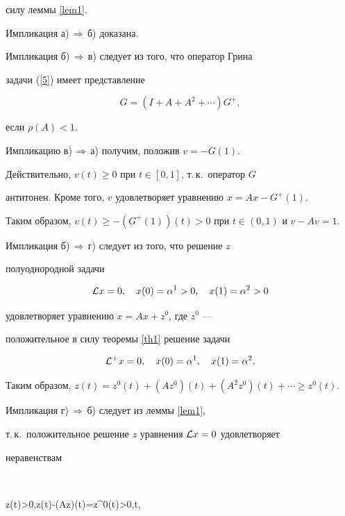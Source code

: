 силу леммы \ref{lem1}.





Импликация а)\,$\Rightarrow$\,б) доказана.





Импликация б)\,$\Rightarrow$\,в) следует из того, что оператор Грина


задачи (\ref{5}) имеет представление


$$


G=(I+A+A^2+\dotsb)G^+,


$$


если $\rho(A)<1$.





Импликацию в)\,$\Rightarrow$\,а) получим, положив $v=-G(1)$.


Действительно, $v(t)\ge0$ при $t\in[0,1]$, т.\,к.~оператор $G$


антитонен. Кроме того, $v$ удовлетворяет уравнению $x=Ax-G^+(1)$.


Таким образом, $v(t)\ge-(G^+(1))(t)>0$ при $t\in(0,1)$ и $v-Av=1$.





Импликация б)\,$\Rightarrow$\,г) следует из того, что решение $z$


полуоднородной задачи


$$


\L x=0,\quad x(0)=\a^1>0,\quad x(1)=\a^2>0


$$


удовлетворяет уравнению $x=Ax+z^0$, где $z^0$ ---


положительное в силу теоремы \ref{th1} решение задачи


$$


\L^+x=0,\quad x(0)=\a^1,\quad x(1)=\a^2.


$$


Таким образом, $z(t)=z^0(t)+(Az^0)(t)+(A^2z^0)(t)+\dotsb\ge


z^0(t)$.





Импликация г)\,$\Rightarrow$\,б) следует из леммы \ref{lem1},


т.\,к.~положительное решение $z$ уравнения ${\cal L} x=0$ удовлетворяет


неравенствам


$$


z(t)>0,\quad z(t)-(Az)(t)=z^0(t)>0,\quad t\in[0,1],


